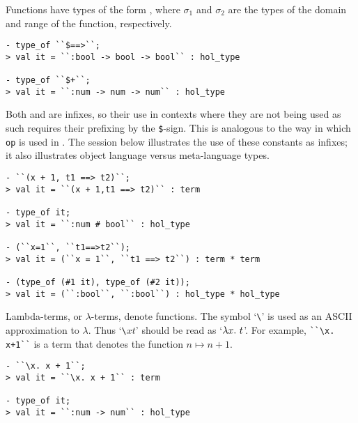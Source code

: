 Functions have types of the form , where $\sigma_1$ and $\sigma_2$ are the types of the domain and range of the function, respectively.

\begin{session}
\begin{verbatim}
- type_of ``$==>``;
> val it = ``:bool -> bool -> bool`` : hol_type

- type_of ``$+``;
> val it = ``:num -> num -> num`` : hol_type
\end{verbatim}
\end{session}

\noindent Both \holtxt{+} and \holtxt{==>} are infixes, so their use in contexts where they are not being used as such requires their prefixing by the \texttt{\$}-sign.
This is analogous to the way in which \texttt{op} is used in \ML.
The session below illustrates the use of these constants as infixes; it also illustrates object language versus meta-language types.

\begin{session}
\begin{verbatim}
- ``(x + 1, t1 ==> t2)``;
> val it = ``(x + 1,t1 ==> t2)`` : term

- type_of it;
> val it = ``:num # bool`` : hol_type

- (``x=1``, ``t1==>t2``);
> val it = (``x = 1``, ``t1 ==> t2``) : term * term

- (type_of (#1 it), type_of (#2 it));
> val it = (``:bool``, ``:bool``) : hol_type * hol_type
\end{verbatim}
\end{session}

Lambda-terms, or $\lambda$-terms, denote functions.
The symbol `{\small\verb|\|}' is used as an {\small ASCII} approximation to $\lambda$.
Thus `{\small\verb|\|}$x$$t$' should be read as `$\lambda x.\ t$'.
For example, {\small\verb|``\x. x+1``|} is a term that denotes the function $n\mapsto n{+}1$.

\begin{session}
\begin{verbatim}
- ``\x. x + 1``;
> val it = ``\x. x + 1`` : term

- type_of it;
> val it = ``:num -> num`` : hol_type
\end{verbatim}
\end{session}

